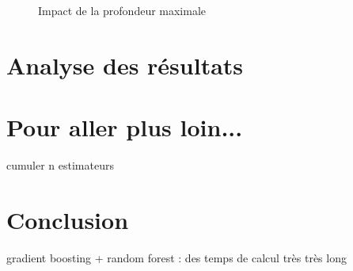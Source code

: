 \documentclass[11pt,a4paper]{article}
\begin{document}
			\begin{figure}
				\begin{center}
					\caption{Impact de la profondeur maximale}
					\label{rf_depth}
				\end{center}
			\end{figure}
\section{Analyse des résultats}

\section{Pour aller plus loin...}
cumuler n estimateurs

\section{Conclusion}
	gradient boosting + random forest : des temps de calcul très très long




%
\end{document}
